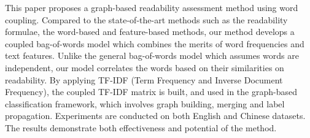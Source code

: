 This paper proposes a graph-based readability assessment method using word coupling. Compared to the state-of-the-art methods such as the readability formulae, the word-based and feature-based methods, our method develops a coupled bag-of-words model which combines the merits of word frequencies and text features. Unlike the general bag-of-words model which assumes words are independent, our model correlates the words based on their similarities on readability. By applying TF-IDF (Term Frequency and Inverse Document Frequency), the coupled TF-IDF matrix is built, and used in the graph-based classification framework, which involves graph building, merging and label propagation. Experiments are conducted on both English and Chinese datasets. The results demonstrate both effectiveness and potential of the method.
